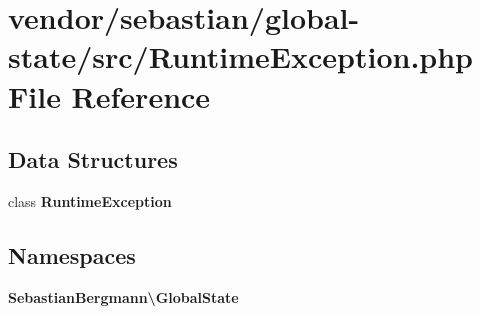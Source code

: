 \section{vendor/sebastian/global-\/state/src/\+Runtime\+Exception.php File Reference}
\label{sebastian_2global-state_2src_2_runtime_exception_8php}
\subsection*{Data Structures}
\begin{DoxyCompactItemize}
\item 
class {\bf Runtime\+Exception}
\end{DoxyCompactItemize}
\subsection*{Namespaces}
\begin{DoxyCompactItemize}
\item 
 {\bf Sebastian\+Bergmann\textbackslash{}\+Global\+State}
\end{DoxyCompactItemize}
